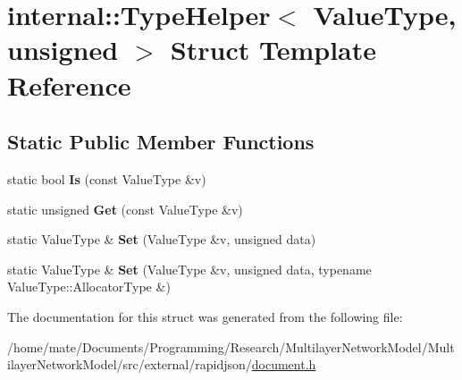 \hypertarget{structinternal_1_1TypeHelper_3_01ValueType_00_01unsigned_01_4}{}\section{internal\+:\+:Type\+Helper$<$ Value\+Type, unsigned $>$ Struct Template Reference}
\label{structinternal_1_1TypeHelper_3_01ValueType_00_01unsigned_01_4}
\subsection*{Static Public Member Functions}
\begin{DoxyCompactItemize}
\item 
static bool {\bfseries Is} (const Value\+Type \&v)\hypertarget{structinternal_1_1TypeHelper_3_01ValueType_00_01unsigned_01_4_ad1c1cb931ed166508d17e866d410c99b}{}\label{structinternal_1_1TypeHelper_3_01ValueType_00_01unsigned_01_4_ad1c1cb931ed166508d17e866d410c99b}

\item 
static unsigned {\bfseries Get} (const Value\+Type \&v)\hypertarget{structinternal_1_1TypeHelper_3_01ValueType_00_01unsigned_01_4_a2f91befe1e9e914e7431b84c0d89f572}{}\label{structinternal_1_1TypeHelper_3_01ValueType_00_01unsigned_01_4_a2f91befe1e9e914e7431b84c0d89f572}

\item 
static Value\+Type \& {\bfseries Set} (Value\+Type \&v, unsigned data)\hypertarget{structinternal_1_1TypeHelper_3_01ValueType_00_01unsigned_01_4_a1d960542fd618ac649fe4e045c44f789}{}\label{structinternal_1_1TypeHelper_3_01ValueType_00_01unsigned_01_4_a1d960542fd618ac649fe4e045c44f789}

\item 
static Value\+Type \& {\bfseries Set} (Value\+Type \&v, unsigned data, typename Value\+Type\+::\+Allocator\+Type \&)\hypertarget{structinternal_1_1TypeHelper_3_01ValueType_00_01unsigned_01_4_a601b05a233b6025486a9105d45d46780}{}\label{structinternal_1_1TypeHelper_3_01ValueType_00_01unsigned_01_4_a601b05a233b6025486a9105d45d46780}

\end{DoxyCompactItemize}


The documentation for this struct was generated from the following file\+:\begin{DoxyCompactItemize}
\item 
/home/mate/\+Documents/\+Programming/\+Research/\+Multilayer\+Network\+Model/\+Multilayer\+Network\+Model/src/external/rapidjson/\hyperlink{document_8h}{document.\+h}\end{DoxyCompactItemize}

